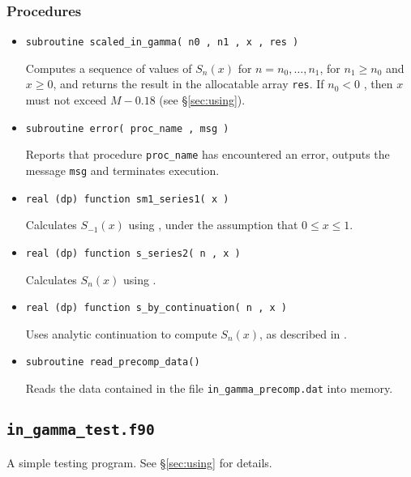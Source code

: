 \documentclass[paper=a4,smallheadings]{scrartcl}
\newcommand\iitem[1]{\item \texttt{#1} \par}
\begin{document}
\subsubsection*{Procedures}
\begin{itemize}
\item \texttt{subroutine scaled\_in\_gamma( n0 , n1 , x , res )}
Computes a sequence of values of $S_n(x)$ for $n=n_{0},\ldots,n_{1}$,
for $n_1\ge n_0$ and $x\ge 0$, and returns the result in the
allocatable array \texttt{res}.  If $n_0<0$ , then $x$ must not exceed
$M-0.18$ (see \S\ref{sec:using}).
%
\item \texttt{subroutine error( proc\_name , msg )}
Reports that procedure \texttt{proc\_name} has encountered an error, outputs
the message \texttt{msg} and terminates execution.
%
\item \texttt{real (dp) function sm1\_series1( x )} 
Calculates $S_{-1}(x)$ using \cite[(12)]{Thompson11b}, 
under the assumption that $0\le x\le 1$. 
%
\iitem{real (dp) function s\_series2( n , x )}
Calculates $S_n(x)$ using \cite[(28)]{Thompson11b}.
%
\item \texttt{real (dp) function s\_by\_continuation( n , x )}
Uses analytic continuation to compute $S_n(x)$, as described in \cite[\S5]{Thompson11b}.
%
\item \texttt{subroutine read\_precomp\_data()} \par
Reads the data contained in the file \texttt{in\_gamma\_precomp.dat} into
memory.
\end{itemize}
%
\subsection{\texttt{in\_gamma\_test.f90}}
\label{in-gamma-test.f90}
A simple testing program. See \S\ref{sec:using} for details.
%


%
\end{document}
